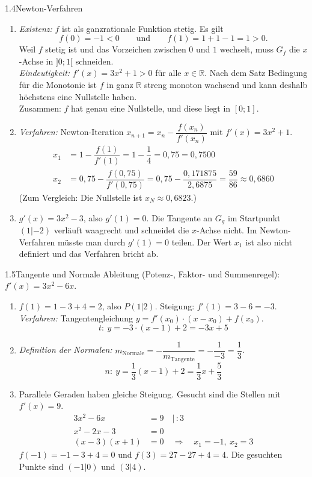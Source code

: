 \begin{loesung}{1.4}{Newton-Verfahren}
\begin{enumerate}[label=\alph*)]
  \item \textit{Existenz:} $f$ ist als ganzrationale Funktion stetig. Es gilt
  \[f(0) = -1 < 0 \qquad\text{und}\qquad f(1) = 1+1-1 = 1 > 0.\]
  Weil $f$ stetig ist und das Vorzeichen zwischen $0$ und $1$ wechselt, muss $G_f$ die $x$-Achse in $]0;1[$ schneiden.\\
  \textit{Eindeutigkeit:} $f'(x) = 3x^2+1 > 0$ für alle $x\in\mathds{R}$. Nach dem Satz \glqq Bedingung für die Monotonie\grqq{} ist $f$ in ganz $\mathds{R}$ streng monoton wachsend und kann deshalb höchstens eine Nullstelle haben.\\
  Zusammen: $f$ hat genau eine Nullstelle, und diese liegt in $[0;1]$.
  \item \textit{Verfahren:} Newton-Iteration $x_{n+1} = x_n - \dfrac{f(x_n)}{f'(x_n)}$ mit $f'(x)=3x^2+1$.
  \begin{align*}
    x_1 &= 1 - \dfrac{f(1)}{f'(1)} = 1-\dfrac{1}{4} = 0{,}75 = 0{,}7500\\
    x_2 &= 0{,}75 - \dfrac{f(0{,}75)}{f'(0{,}75)} = 0{,}75 - \dfrac{0{,}171875}{2{,}6875} = \dfrac{59}{86} \approx 0{,}6860
  \end{align*}
  (Zum Vergleich: Die Nullstelle ist $x_N\approx 0{,}6823$.)
  \item $g'(x) = 3x^2-3$, also $g'(1) = 0$. Die Tangente an $G_g$ im Startpunkt $(1|-2)$ verläuft waagrecht und schneidet die $x$-Achse nicht. Im Newton-Verfahren müsste man durch $g'(1)=0$ teilen. Der Wert $x_1$ ist also nicht definiert und das Verfahren bricht ab.
\end{enumerate}
\end{loesung}


\begin{loesung}{1.5}{Tangente und Normale}
Ableitung (Potenz-, Faktor- und Summenregel): $f'(x) = 3x^2-6x$.
\begin{enumerate}[label=\alph*)]
  \item $f(1) = 1-3+4 = 2$, also $P(1|2)$. Steigung: $f'(1) = 3-6 = -3$.\\
  \textit{Verfahren:} Tangentengleichung $y = f'(x_0)\cdot(x-x_0)+f(x_0)$.
  \[t:\ y = -3\cdot(x-1)+2 = -3x+5\]
  \item \textit{Definition der Normalen:} $m_{\text{Normale}} = -\dfrac{1}{m_{\text{Tangente}}} = -\dfrac{1}{-3} = \dfrac{1}{3}$.
  \[n:\ y = \dfrac{1}{3}(x-1)+2 = \dfrac{1}{3}x+\dfrac{5}{3}\]
  \item Parallele Geraden haben gleiche Steigung. Gesucht sind die Stellen mit $f'(x)=9$.
  \begin{align*}
    3x^2-6x &= 9 \quad\Big|\,:3\\
    x^2-2x-3 &= 0\\
    (x-3)(x+1) &= 0 \quad\Longrightarrow\quad x_1 = -1,\ x_2 = 3
  \end{align*}
  $f(-1) = -1-3+4 = 0$ und $f(3) = 27-27+4 = 4$. Die gesuchten Punkte sind $(-1|0)$ und $(3|4)$.
\end{enumerate}
\end{loesung}

